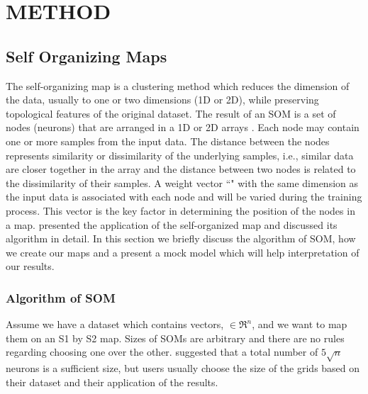 
\section{METHOD}
\label{sec: method}
 \subsection{Self Organizing Maps}
 \label{sec: som}
 
 The self-organizing map is a clustering method which reduces the dimension of the data, usually to one or two dimensions (1D or 2D), while preserving topological features of the original dataset.
 The result of an SOM is a set of nodes (neurons) that are arranged in a 1D or 2D arrays \citep{Kohonen98}. 
 Each node may contain one or more samples from the input data.
 The distance between the nodes represents similarity or dissimilarity of the underlying samples, i.e., similar data are closer together in the array and the distance between two nodes is related to the dissimilarity of their samples.
 A weight vector ``" with the same dimension as the input data is associated with each node and will be varied during the training process.
 This vector is the key factor in determining the position of the nodes in a map.
 \cite{Geach12} presented the application of the self-organized map and discussed its algorithm in detail.
 In this section we briefly discuss the algorithm of SOM, how we create our maps and a present a mock model which will help interpretation of our results. 
 
 \subsubsection{Algorithm of SOM} 
 \label{sec: algorithm}
     Assume we have a dataset which contains vectors,  $\in \Re^n$, and we want to map them on an S1 by S2 map. 
     Sizes of SOMs are arbitrary and there are no rules regarding choosing one over the other. 
    \citet{Vesanto05} suggested that a total number of $5\sqrt{n}$ neurons is a sufficient size, but users usually choose the size of the grids based on their dataset and their application of the results.

